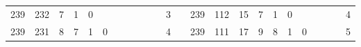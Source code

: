 {\begin{tabular}{cccccccccccclccccccccccc}
239                                                & 232                                                & 7                                                & 1                                                & 0                                                &                                                  &                                                 &                                                 &                                                 &                                                 &                                                 & 3                                                &                          & 239                                                & 112                                                & 15                                               & 7                                                & 1                                               & 0                                               &                                                 &                                                 &                                                 &                                                 & 4                                                \\
239                                                & 231                                                & 8                                                & 7                                                & 1                                                & 0                                                &                                                 &                                                 &                                                 &                                                 &                                                 & 4                                                &                          & 239                                                & 111                                                & 17                                               & 9                                                & 8                                               & 1                                               & 0                                               &                                                 &                                                 &                                                 & 5                                                \\

\end{tabular}}
